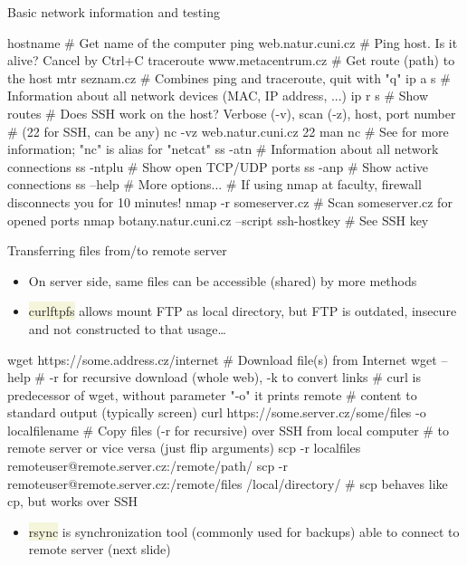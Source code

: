 \documentclass[compress, xelatex, 11pt, xcolor=svgnames, aspectratio=169,
	hyperref={
		bookmarks=true,
		unicode=true,
		colorlinks=true,
		pdftitle={Linux, command line and MetaCentrum},
		plainpages=false,
		pdfauthor={Vojtech Zeisek},
		pdfsubject={Course about use of Linux command line, writing shell scripts and using MetaCentrum of CESNET},
		pdfcreator={XeLaTeX},
		pdfkeywords={Linux, GNU, BASH, shell, command line, MetaCentrum},
		linkcolor=DarkRed, %
		anchorcolor=DarkBlue, %
		citecolor=Indigo, %
		filecolor=NavyBlue, %
		menucolor=DarkMagenta, %
		urlcolor=DarkBlue, %
		},
	url={hyphens, lowtilde} %
	]{beamer}
\renewcommand{\texttt}[1]{\colorbox{Beige}{{\ttfamily #1}}}
\begin{document}
\begin{frame}[fragile]{Basic network information and testing} %
	\begin{bashcode}
    hostname # Get name of the computer
    ping web.natur.cuni.cz # Ping host. Is it alive? Cancel by Ctrl+C
    traceroute www.metacentrum.cz # Get route (path) to the host
    mtr seznam.cz # Combines ping and traceroute, quit with "q"
    ip a s # Information about all network devices (MAC, IP address, ...)
    ip r s # Show routes
    # Does SSH work on the host? Verbose (-v), scan (-z), host, port number
    # (22 for SSH, can be any)
    nc -vz web.natur.cuni.cz 22
    man nc # See for more information; "nc" is alias for "netcat"
    ss -atn # Information about all network connections
    ss -ntplu # Show open TCP/UDP ports
    ss -anp # Show active connections
    ss --help # More options...
    # If using nmap at faculty, firewall disconnects you for 10 minutes!
    nmap -r someserver.cz # Scan someserver.cz for opened ports
    nmap botany.natur.cuni.cz --script ssh-hostkey # See SSH key
	\end{bashcode}
\end{frame}

\begin{frame}[fragile]{Transferring files from/to remote server}
	\label{transfers}
	\begin{itemize}
		\item On server side, same files can be accessible (shared) by more methods
		\item \texttt{curlftpfs} allows mount FTP as local directory, but FTP is outdated, insecure and not constructed to that usage\ldots
	\end{itemize}
	\vfill
	\begin{bashcode}
    wget https://some.address.cz/internet # Download file(s) from Internet
    wget --help # -r for recursive download (whole web), -k to convert links
    # curl is predecessor of wget, without parameter "-o" it prints remote
    # content to standard output (typically screen)
    curl https://some.server.cz/some/files -o localfilename
    # Copy files (-r for recursive) over SSH from local computer
    # to remote server or vice versa (just flip arguments)
    scp -r localfiles remoteuser@remote.server.cz:/remote/path/
    scp -r remoteuser@remote.server.cz:/remote/files /local/directory/
    # scp behaves like cp, but works over SSH
	\end{bashcode}
	\vfill
	\begin{itemize}
		\item \texttt{rsync} is synchronization tool (commonly used for backups) able to connect to remote server (next slide)
	\end{itemize}
\end{frame}
\end{document}

